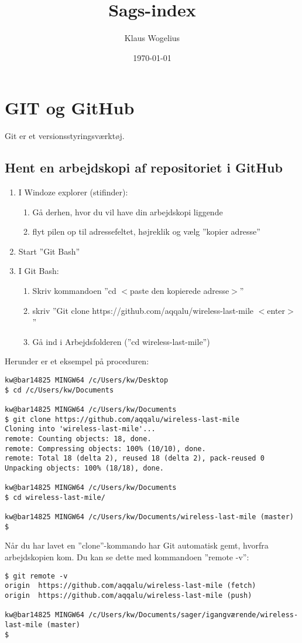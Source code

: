 \documentclass[11pt,a4paper,twoside]{report}
\title{Sags-index}
\author{Klaus Wogelius}
\date{\today}
\begin{document}
\maketitle
\tableofcontents

\chapter{GIT og GitHub}
Git er et versionsstyringsværktøj.
\section{Hent en arbejdskopi af repositoriet i GitHub}
\begin{enumerate}

 \item I Windoze explorer (stifinder):
 \begin{enumerate}
  \item Gå derhen, hvor du vil have din arbejdskopi liggende
  \item flyt pilen op til adressefeltet, højreklik og vælg ''kopier adresse''
 \end{enumerate}
 \item Start ''Git Bash''
 \item I Git Bash:
 \begin{enumerate}
  \item Skriv kommandoen ''cd $<$paste den kopierede adresse$>$''
  \item skriv ''Git clone https://github.com/aqqalu/wireless-last-mile $<$enter$>$''
  \item Gå ind i Arbejdsfolderen (''cd wireless-last-mile'')
 \end{enumerate}
\end{enumerate}
Herunder er et eksempel på proceduren:
\begin{verbatim}
kw@bar14825 MINGW64 /c/Users/kw/Desktop
$ cd /c/Users/kw/Documents

kw@bar14825 MINGW64 /c/Users/kw/Documents
$ git clone https://github.com/aqqalu/wireless-last-mile
Cloning into 'wireless-last-mile'...
remote: Counting objects: 18, done.
remote: Compressing objects: 100% (10/10), done.
remote: Total 18 (delta 2), reused 18 (delta 2), pack-reused 0
Unpacking objects: 100% (18/18), done.

kw@bar14825 MINGW64 /c/Users/kw/Documents
$ cd wireless-last-mile/

kw@bar14825 MINGW64 /c/Users/kw/Documents/wireless-last-mile (master)
$
\end{verbatim}
\par
Når  du har lavet en ''clone''-kommando har Git automatisk gemt, hvorfra arbejdskopien kom. Du kan se dette med kommandoen ''remote -v'':
\begin{verbatim}
$ git remote -v
origin  https://github.com/aqqalu/wireless-last-mile (fetch)
origin  https://github.com/aqqalu/wireless-last-mile (push)

kw@bar14825 MINGW64 /c/Users/kw/Documents/sager/igangværende/wireless-last-mile (master)
$ 
\end{verbatim}
\end{document}
